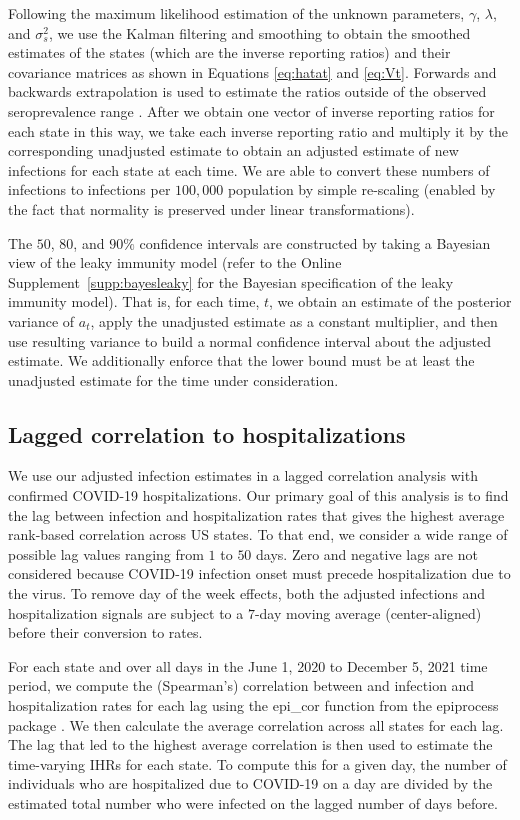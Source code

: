 \documentclass{article}
\begin{document}
Following the maximum likelihood estimation of the unknown parameters, $\gamma$,
$\lambda$, and $\sigma^2_s$, we use the Kalman filtering and smoothing to obtain the
smoothed estimates of the states (which are the inverse reporting ratios) and
their covariance matrices as shown in Equations \ref{eq:hatat} and \ref{eq:Vt}.
Forwards and backwards extrapolation is used to estimate the ratios outside of the 
observed seroprevalence range \citet{durbin2012time}. After we obtain one vector of 
inverse reporting ratios for each state in this
way, we take each inverse reporting ratio and multiply it by the corresponding
unadjusted estimate to obtain an adjusted estimate of new infections for each
state at each time. We are able to convert these numbers of infections to
infections per $100,000$ population by simple re-scaling (enabled by the fact
that normality is preserved under linear transformations).

The $50$, $80$, and $90\%$ confidence intervals are constructed by taking a
Bayesian view of the leaky immunity model (refer to the Online
Supplement~\ref{supp:bayesleaky} for the Bayesian specification of the leaky
immunity model). That is, for each time, $t$, we obtain an estimate of the
posterior variance of $a_t$, apply the unadjusted estimate as a constant
multiplier, and then use resulting variance to build a normal confidence
interval about the adjusted estimate. We additionally enforce that the lower
bound must be at least the unadjusted estimate for the time under consideration.

\subsection{Lagged correlation to hospitalizations} 

We use our adjusted infection estimates in a lagged correlation analysis with
confirmed COVID-19 hospitalizations. Our primary goal of this analysis is to
find the lag between infection and hospitalization rates that gives the highest
average rank-based correlation across US states. To that end, we consider a wide
range of possible lag values ranging from $1$ to $50$ days. Zero and negative
lags are not considered because COVID-19 infection onset must precede
hospitalization due to the virus. To remove day of the week effects, both the
adjusted infections and hospitalization signals are subject to a $7$-day moving
average (center-aligned) before their conversion to rates.

For each state and over all days in the June 1, 2020 to December 5, 2021 time
period, we compute the (Spearman’s) correlation between and infection and
hospitalization rates for each lag using the epi\_cor function from the
epiprocess package \citep{brooks2023epiprocess}. We then calculate the average
correlation across all states for each lag. The lag that led to the highest
average correlation is then used to estimate the time-varying IHRs for each
state. To compute this for a given day, the number of individuals who are
hospitalized due to COVID-19 on a day are divided by the estimated total number
who were infected on the lagged number of days before.
\end{document}
